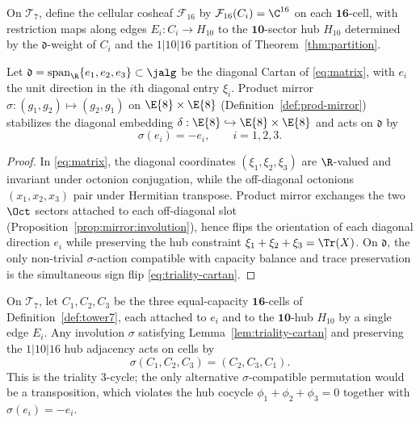 \begin{definition}\label{def:F16}
On $\mathcal{T}_7$, define the cellular cosheaf $\mathcal{F}_{16}$ by
$\mathcal{F}_{16}(C_i)=\C^{16}$ on each $\mathbf{16}$-cell, with restriction
maps along edges $E_i:C_i\to H_{10}$ to the $\mathbf{10}$-sector hub $H_{10}$
determined by the $\mathfrak{d}$-weight of $C_i$ and the $1|10|16$ partition
of Theorem~\ref{thm:partition}.
\end{definition}

\begin{lemma}\label{lem:triality-cartan}
Let $\mathfrak{d}=\mathrm{span}_\R\{e_1,e_2,e_3\}\subset\jalg$ be the diagonal
Cartan of \eqref{eq:matrix}, with $e_i$ the unit direction in the $i$th diagonal
entry $\xi_i$. Product mirror
$\sigma:(g_1,g_2)\mapsto(g_2,g_1)$ on $\E{8}\times\E{8}$
(Definition~\ref{def:prod-mirror}) stabilizes the diagonal embedding
$\delta:\E{8}\hookrightarrow\E{8}\times\E{8}$ and acts on $\mathfrak{d}$ by
\begin{equation}\label{eq:triality-cartan}
  \sigma(e_i)=-e_i,
  \qquad i=1,2,3.
\end{equation}
\end{lemma}

\begin{proof}
In \eqref{eq:matrix}, the diagonal coordinates $(\xi_1,\xi_2,\xi_3)$ are
$\R$-valued and invariant under octonion conjugation, while the off-diagonal
octonions $(x_1,x_2,x_3)$ pair under Hermitian transpose. Product mirror
exchanges the two $\Oct$ sectors attached to each off-diagonal slot
(Proposition~\ref{prop:mirror:involution}), hence flips the orientation of each
diagonal direction $e_i$ while preserving the hub constraint
$\xi_1+\xi_2+\xi_3=\Tr(X)$. On $\mathfrak{d}$, the only non-trivial
$\sigma$-action compatible with capacity balance and trace preservation is the
simultaneous sign flip \eqref{eq:triality-cartan}.
\end{proof}

\begin{lemma}\label{lem:triality-perm}
On $\mathcal{T}_7$, let $C_1,C_2,C_3$ be the three equal-capacity
$\mathbf{16}$-cells of Definition~\ref{def:tower7}, each attached to $e_i$ and
to the $\mathbf{10}$-hub $H_{10}$ by a single edge $E_i$. Any involution
$\sigma$ satisfying Lemma~\ref{lem:triality-cartan} and preserving the
$1|10|16$ hub adjacency acts on cells by
\begin{equation}\label{eq:triality-perm}
  \sigma(C_1,C_2,C_3)=(C_2,C_3,C_1).
\end{equation}
This is the triality $3$-cycle; the only alternative $\sigma$-compatible
permutation would be a transposition, which violates the hub cocycle
$\phi_1+\phi_2+\phi_3=0$ together with $\sigma(e_i)=-e_i$.
\end{lemma}


